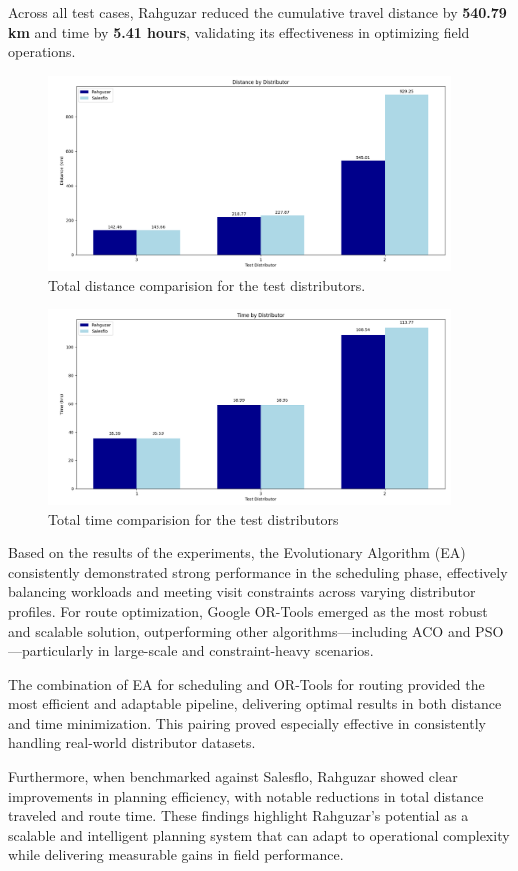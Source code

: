 Across all test cases, Rahguzar reduced the cumulative travel distance by \textbf{540.79 km} and time by \textbf{5.41 hours}, validating its effectiveness in optimizing field operations.

\begin{figure}[H]
    \centering
    \includegraphics[width=0.95\textwidth]{images/distance_rahgyzar_salesflo_comp}
    \caption{Total distance comparision for the test distributors.}
    \label{fig:results_distance_comparision}
\end{figure}


\begin{figure}[H]
    \centering
    \includegraphics[width=0.95\textwidth]{images/time_rahgyzar_salesflo_comp}
    \caption{Total time comparision for the test distributors}
    \label{fig:results_time_comparision}
\end{figure}


Based on the results of the experiments, the Evolutionary Algorithm (EA) consistently demonstrated strong performance in the scheduling phase, effectively balancing workloads and meeting visit constraints across varying distributor profiles. For route optimization, Google OR-Tools emerged as the most robust and scalable solution, outperforming other algorithms—including ACO and PSO—particularly in large-scale and constraint-heavy scenarios.

The combination of EA for scheduling and OR-Tools for routing provided the most efficient and adaptable pipeline, delivering optimal results in both distance and time minimization. This pairing proved especially effective in consistently handling real-world distributor datasets.

Furthermore, when benchmarked against Salesflo, Rahguzar showed clear improvements in planning efficiency, with notable reductions in total distance traveled and route time. These findings highlight Rahguzar’s potential as a scalable and intelligent planning system that can adapt to operational complexity while delivering measurable gains in field performance.